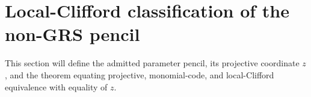 \section{Local-Clifford classification of the non-GRS pencil}

This section will define the admitted parameter pencil, its projective
coordinate \(z\), and the theorem equating projective, monomial-code, and
local-Clifford equivalence with equality of \(z\).
